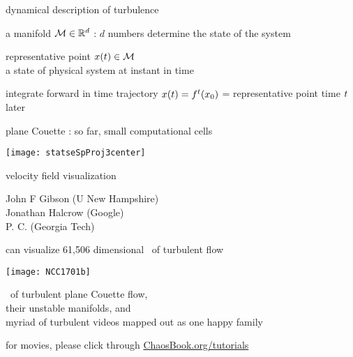 \begin{frame}{dynamical description of turbulence}

\begin{block}{\statesp}
a manifold $\mathcal{M} \in \mathbb{R}^{d}$ :
$d$ numbers determine the state of the system
\end{block}

\bigskip

\begin{block}{representative point }
$x(t) \in \mathcal{M}$
\\
a state of physical system at instant in time
\end{block}

\bigskip

\begin{block}{\color{red}integrate forward in time}
trajectory $x(t) = {f^{t}({x_0})}$ =
representative point time $t$ later
\end{block}
\end{frame}


\begin{frame}{plane Couette : so far, {\Huge small} computational cells
}
\begin{center}
\texttt{[image: statseSpProj3center]}
\end{center}
velocity field visualization
\vfill

{\scriptsize
John F Gibson (U New Hampshire)
\\
Jonathan Halcrow (Google)
\\
P. C. (Georgia Tech)
}
\end{frame}

\begin{frame}{can visualize 61,506 dimensional \statesp\ of turbulent flow}
\begin{center}
\texttt{[image: NCC1701b]}
\end{center}
\eqva\ of turbulent plane Couette flow,
\\
their unstable manifolds, and
\\
myriad of turbulent videos mapped out as one happy family

\bigskip

\hfill   {\small
          for movies, please click through
            \textcolor{blue}{\href{http://ChaosBook.org/tutorials}
             {ChaosBook.org/tutorials}}
          }
\end{frame}

